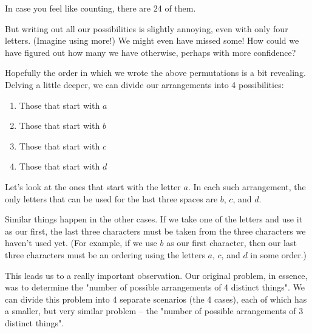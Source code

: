 In case you feel like counting, there are 24 of them.

But writing out all our possibilities is slightly annoying, even with only four letters. (Imagine using more!) We might even have missed some! How could we have figured out how many we have otherwise, perhaps with more confidence? %

Hopefully the order in which we wrote the above permutations is a bit revealing. Delving a little deeper, we can divide our arrangements into 4 possibilities:

\begin{enumerate}
\item Those that start with $a$
\item Those that start with $b$
\item Those that start with $c$
\item Those that start with $d$
\end{enumerate}

Let's look at the ones that start with the letter $a$. In each such arrangement, the only letters that can be used for the last three spaces are $b$, $c$, and $d$. 

Similar things happen in the other cases. If we take one of the letters and use it as our first, the last three characters must be taken from the three characters we haven't used yet. (For example, if we use $b$ as our first character, then our last three characters must be an ordering using the letters $a$, $c$, and $d$ in some order.) %

This leads us to a really important observation. Our original problem, in essence, was to determine the "number of possible arrangements of 4 distinct things". We can divide this problem into 4 separate scenarios (the 4 cases), each of which has a smaller, but very similar problem -- the "number of possible arrangements of 3 distinct things".



